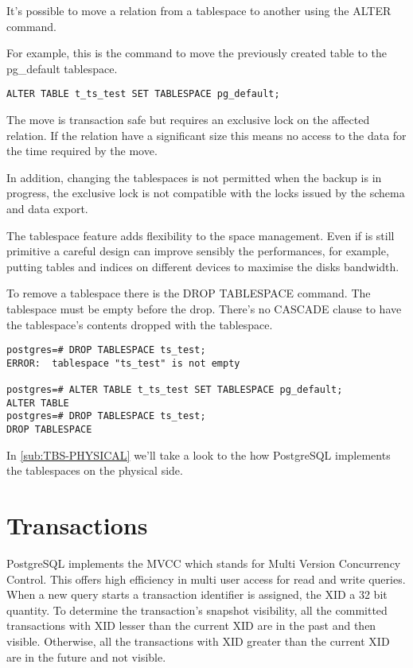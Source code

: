 It's possible to move a relation from a tablespace to another using the 
ALTER command.

For example, this is the command to move the previously created table to the 
pg\_default tablespace.

\begin{lstlisting}[style=pgsql]
ALTER TABLE t_ts_test SET TABLESPACE pg_default;
\end{lstlisting}

The move is transaction safe but requires an exclusive lock on the affected 
relation. If the relation have a significant size this means no access to 
the data for the time required by the move.

In addition, changing the tablespaces is not permitted when the backup is in 
progress, the exclusive lock is not compatible with the locks issued by the 
schema and data export.

The tablespace feature adds flexibility to the space management. Even if is 
still primitive a careful design can improve sensibly the performances, for 
example, putting tables and indices on different devices to maximise the disks 
bandwidth.

To remove a tablespace there is the  DROP TABLESPACE command. The tablespace 
must be empty before the drop. There's no CASCADE clause to have the 
tablespace's contents dropped with the tablespace.

\begin{lstlisting}[style=pgsql]
postgres=# DROP TABLESPACE ts_test;
ERROR:  tablespace "ts_test" is not empty

postgres=# ALTER TABLE t_ts_test SET TABLESPACE pg_default;
ALTER TABLE
postgres=# DROP TABLESPACE ts_test;
DROP TABLESPACE

\end{lstlisting}

In \ref{sub:TBS-PHYSICAL} we'll take a look to the how PostgreSQL 
implements the tablespaces on the physical side.

\section{Transactions}
\label{sec:TRANSACTION}
PostgreSQL implements the MVCC which stands for Multi Version 
Concurrency Control. 
This offers high efficiency in multi user access for read and write queries.
When a new query starts a transaction identifier is assigned, the XID 
 a 32 bit quantity. To determine the transaction's snapshot 
visibility, all the committed transactions with XID lesser than the current XID 
are in the past and then visible. Otherwise, all the transactions with XID 
greater than the current XID are in the future and not visible.\newline


